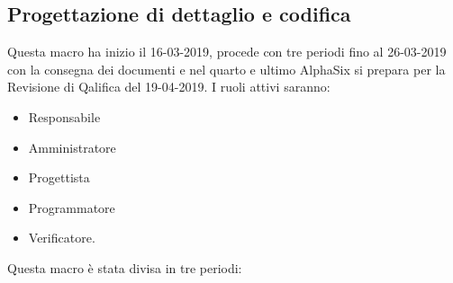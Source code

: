         \subsection{Progettazione di dettaglio e codifica}
        Questa macro ha inizio il 16-03-2019, procede con tre periodi fino al 26-03-2019 con la consegna dei documenti e nel
        quarto e ultimo AlphaSix si prepara per la Revisione di Qalifica del 19-04-2019. I ruoli attivi saranno: 
        \begin{itemize}
            \item Responsabile
            \item Amministratore
            \item Progettista
            \item Programmatore
            \item Verificatore.
        \end{itemize}
        Questa macro è stata divisa in tre periodi:
